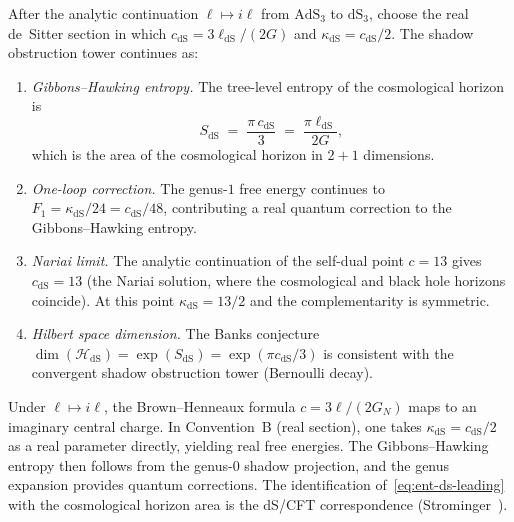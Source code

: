 \begin{conjecture}
\label{conj:ent-desitter}
After the analytic continuation $\ell\mapsto i\ell$ from
$\mathrm{AdS}_3$ to $\mathrm{dS}_3$, choose the real de~Sitter
section in which
$c_{\mathrm{dS}} = 3\ell_{\mathrm{dS}}/(2G)$ and
$\kappa_{\mathrm{dS}} = c_{\mathrm{dS}}/2$.
The shadow obstruction tower continues as:
\begin{enumerate}[label=\textup{(\roman*)}]
\item \emph{Gibbons--Hawking entropy.}
 The tree-level entropy of the cosmological horizon is
 \begin{equation}\label{eq:ent-ds-leading}
 S_{\mathrm{dS}}
 \;=\;
 \frac{\pi\,c_{\mathrm{dS}}}{3}
 \;=\;
 \frac{\pi\ell_{\mathrm{dS}}}{2G},
 \end{equation}
 which is the area of the cosmological horizon
 in $2{+}1$ dimensions.

\item \emph{One-loop correction.}
 The genus-$1$ free energy continues to
 $F_1 = \kappa_{\mathrm{dS}}/24 = c_{\mathrm{dS}}/48$,
 contributing a real quantum correction to the
 Gibbons--Hawking entropy.

\item \emph{Nariai limit.}
 The analytic continuation of the self-dual point
 $c = 13$ gives $c_{\mathrm{dS}} = 13$
 (the Nariai solution, where the cosmological and
 black hole horizons coincide). At this point
 $\kappa_{\mathrm{dS}} = 13/2$ and the
 complementarity is symmetric.

\item \emph{Hilbert space dimension.}
 The Banks conjecture
 $\dim(\mathcal{H}_{\mathrm{dS}})
 = \exp(S_{\mathrm{dS}})
 = \exp(\pi c_{\mathrm{dS}}/3)$
 is consistent with the convergent shadow obstruction tower
 \textup{(}Bernoulli decay\textup{)}.
\end{enumerate}
\end{conjecture}

\begin{remark}
Under $\ell \mapsto i\ell$, the Brown--Henneaux formula
$c = 3\ell/(2G_N)$ maps to an imaginary central charge.
In Convention~B (real section), one takes
$\kappa_{\mathrm{dS}} = c_{\mathrm{dS}}/2$ as a real
parameter directly, yielding real free energies.
The Gibbons--Hawking entropy then follows from the genus-$0$
shadow projection, and the genus expansion provides quantum
corrections. The identification of~\eqref{eq:ent-ds-leading}
with the cosmological horizon area is the dS/CFT
correspondence (Strominger~\cite{Strominger01}).
\end{remark}

